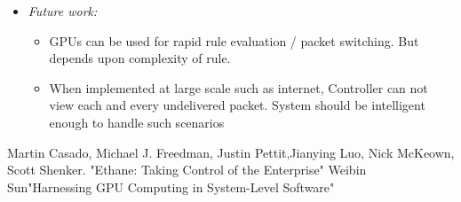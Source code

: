 \documentclass[letterpaper,twocolumn,10pt]{article}
\begin{document}
\begin{itemize}
\item {\it Future work:} 
\begin{itemize}

\item GPUs can be used for rapid rule evaluation / packet switching. But depends upon complexity of rule.\cite{GPU}
\item When implemented at large scale such as internet, Controller can not view each and every undelivered packet. System should be intelligent enough to handle such scenarios

\end{itemize}

\end{itemize}

\begin{thebibliography}{1}
 Martin Casado, Michael J. Freedman, Justin Pettit,Jianying Luo, Nick McKeown, Scott Shenker. "Ethane: Taking Control of the Enterprise"
 Weibin Sun"Harnessing GPU Computing in System-Level Software"
\end{thebibliography}
\end{document}

